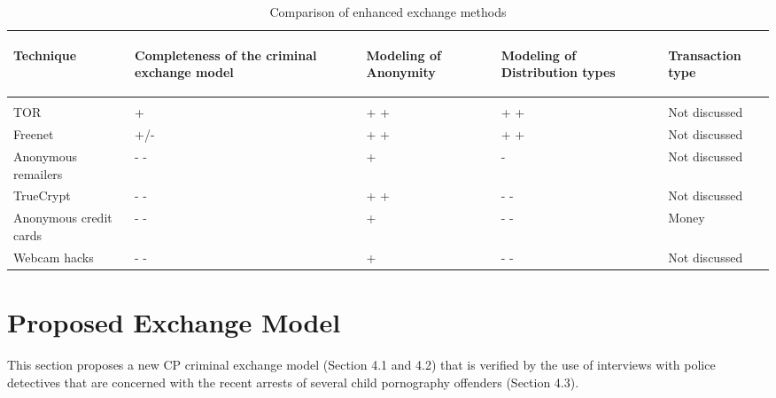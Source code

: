 \documentclass{sig-alternate-br}
\begin{document}
\begin{table}[!ht]
\caption{Comparison of enhanced exchange methods}
\begin{tabular}{|p{}||p{}|p{}|p{}|p{}|}
\hline
\begin{sideways} \parbox{30mm}{\centering Technique} \end{sideways} & \begin{sideways} \parbox{30mm}{\centering Completeness of the criminal exchange model} \end{sideways} & \begin{sideways} \parbox{30mm}{\centering Modeling of Anonymity} \end{sideways} &  \begin{sideways} \parbox{30mm}{\centering Modeling of Distribution types} \end{sideways} & \begin{sideways} \parbox{30mm}{\centering Transaction type} \end{sideways} \\ \hline & \\[-1em]\hline
TOR \cite{dingledine2004tor} & + & + + & + + & Not discussed \\ \hline
Freenet \cite{clarke2001freenet} & +/- & + + & + +  & Not discussed \\ \hline
Anonymous remailers \cite{danezis2003mixminion} & - - & + & - & Not discussed \\ \hline
TrueCrypt \cite{miao2010research}   & - - & + + & - - & Not discussed \\ \hline
Anonymous credit cards \cite{wall2007cybercrime}   & - - & + & - - & Money \\ \hline
Webcam hacks \cite{mishna2009ongoing,salomon2010examples}   & - - & + & - - & Not discussed \\ \hline
\end{tabular}
\label{tables:dataExchangeCompared}
\end{table}


\section{Proposed Exchange Model}
This section proposes a new CP criminal exchange model (Section 4.1 and 4.2) that is verified by the use of interviews with police detectives that are concerned with the recent arrests of several child pornography offenders (Section 4.3). 
\end{document}
